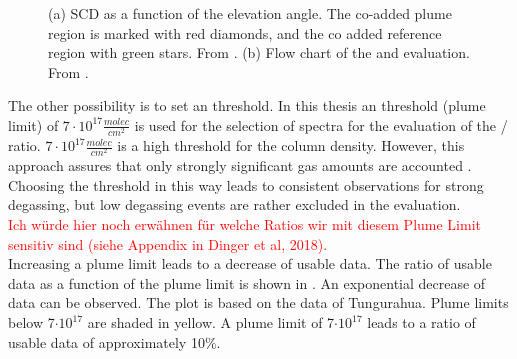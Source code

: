 \begin{figure}
	\caption{(a)  SCD as a function of the elevation angle. The co-added plume region is marked with red diamonds, and the co added reference region with green stars. From \cite{WarnachSimon}. (b) Flow chart of the   and  evaluation. From \cite{lubcke2014optical}.}
	\label{fig:algorithm}
\end{figure}
The other possibility is to set an  threshold. In this thesis an  threshold (plume limit) of $7\cdot 10^{17} \frac{molec}{cm^2}$ is used for the selection of spectra for the evaluation of the / ratio. $7\cdot 10^{17} \frac{molec}{cm^2}$ is a high threshold for the column density. However, this approach assures that only strongly significant gas amounts are accounted \citep{lubcke2014bro}. Choosing the  threshold in this way leads to consistent observations for strong degassing, but low degassing events are rather excluded in the evaluation.\\
\textcolor{red}{Ich würde hier noch erwähnen für welche Ratios wir mit diesem Plume Limit sensitiv sind (siehe Appendix in Dinger et al, 2018).}\\
Increasing a plume limit leads to a decrease of usable data. The ratio of usable  data as a function of the plume limit is shown in . An exponential decrease of data can be observed. The plot is based on the data of Tungurahua. Plume limits below 7$\cdot10^{17}$ are shaded in yellow. A plume limit of 7$\cdot10^{17}$ leads to a ratio of usable data of approximately 10\%.
